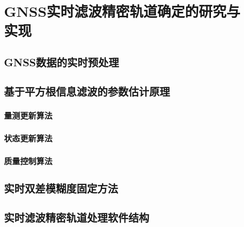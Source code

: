 
\chapter{GNSS实时滤波精密轨道确定的研究与实现}

\section{GNSS数据的实时预处理}

\section{基于平方根信息滤波的参数估计原理}

\subsection{量测更新算法}

\subsection{状态更新算法}

\subsection{质量控制算法}

\section{实时双差模糊度固定方法}

\section{实时滤波精密轨道处理软件结构}